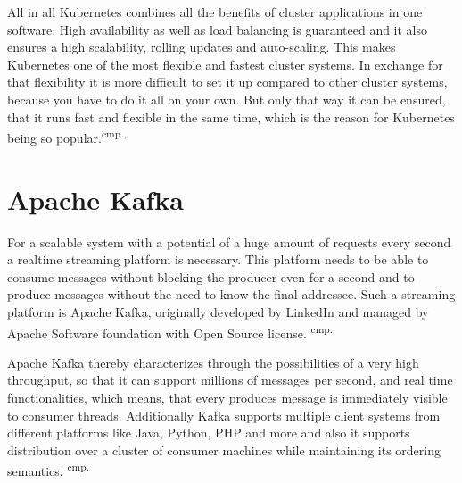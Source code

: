 
All in all Kubernetes combines all the benefits of cluster applications in one software. High availability as well as load balancing is guaranteed and it also ensures a high scalability, rolling updates and auto-scaling. This makes Kubernetes one of the most flexible and fastest cluster systems. In exchange for that flexibility it is more difficult to set it up compared to other cluster systems, because you have to do it all on your own. But only that way it can be ensured, that it runs fast and flexible in the same time, which is the reason for Kubernetes being so popular.\textsuperscript{cmp.\cite{24}, \cite{25}}


\section{Apache Kafka}

For a scalable system with a potential of a huge amount of requests every second a realtime streaming platform is necessary. This platform needs to be able to consume messages without blocking the producer even for a second and to produce messages without the need to know the final addressee. Such a streaming platform is Apache Kafka, originally developed by LinkedIn and managed by Apache Software foundation with Open Source license. \textsuperscript{cmp.\cite{26}}


Apache Kafka thereby characterizes through the possibilities of a very high throughput, so that it can support millions of messages per second, and real time functionalities, which means, that every produces message is immediately visible to consumer threads. Additionally Kafka supports multiple client systems from different platforms like Java, Python, PHP and more and also it supports distribution over a cluster of consumer machines while maintaining its ordering semantics. \textsuperscript{cmp.\cite{26}}


